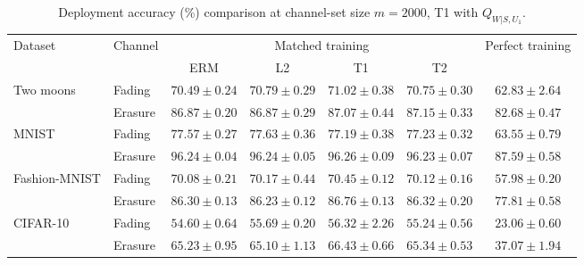 \begin{table}[htb]
\centering
\caption{Deployment accuracy (\%) comparison at channel-set size $m=2000$, T1 with $Q_{W|S,U_1}$.}
\label{tab:performance}
\begin{tabular*}{\linewidth}{@{\extracolsep{\fill}}llccccc@{}}
\toprule
\multirow{2}{*}{Dataset} & \multirow{2}{*}{Channel}
& \multicolumn{4}{c}{Matched training} & \multirow{2}{*}{Perfect training} \\
\cmidrule(lr){3-6}
& & ERM & L2 & T1 & T2 &  \\
\midrule
\multirow{2}{*}{Two moons}
& Fading
& $70.49\pm0.24$ & $70.79\pm0.29$ & $\mathbf{71.02}\pm0.38$ & $70.75\pm0.30$ & $62.83\pm2.64$ \\
& Erasure
& $86.87\pm0.20$ & $86.87\pm0.29$ & $87.07\pm0.44$ & $\mathbf{87.15}\pm0.33$ & $82.68\pm0.47$ \\
\midrule
\multirow{2}{*}{MNIST}
& Fading
& $77.57\pm0.27$ & $\mathbf{77.63}\pm0.36$ & $77.19\pm0.38$ & $77.23\pm0.32$ & $63.55\pm0.79$ \\
& Erasure
& $96.24\pm0.04$ & $96.24\pm0.05$ & $\mathbf{96.26}\pm0.09$ & $96.23\pm0.07$ & $87.59\pm0.58$ \\
\midrule
\multirow{2}{*}{Fashion-MNIST}
& Fading
& $70.08\pm0.21$ & $70.17\pm0.44$ & $\mathbf{70.45}\pm0.12$ & $70.12\pm0.16$ & $57.98\pm0.20$ \\
& Erasure
& $86.30\pm0.13$ & $86.23\pm0.12$ & $\mathbf{86.76}\pm0.13$ & $86.32\pm0.20$ & $77.81\pm0.58$ \\
\midrule
\multirow{2}{*}{CIFAR-10}
& Fading
& $54.60\pm0.64$ & $55.69\pm0.20$ & $\mathbf{56.32}\pm2.26$ & $55.24\pm0.56$ & $23.06\pm0.60$ \\
& Erasure
& $65.23\pm0.95$ & $65.10\pm1.13$ & $\mathbf{66.43}\pm0.66$ & $65.34\pm0.53$ & $37.07\pm1.94$ \\
\bottomrule
\end{tabular*}
\end{table}
